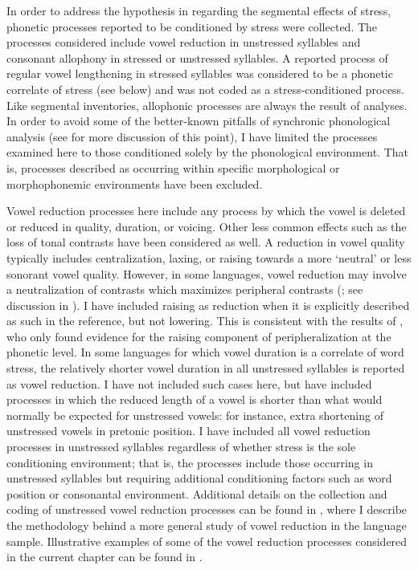   In order to address the hypothesis in  regarding the segmental effects of stress, phonetic processes reported to be conditioned by stress were collected. The processes considered include vowel reduction in unstressed syllables and consonant allophony in stressed or unstressed syllables. A reported process of regular vowel lengthening in stressed syllables was considered to be a phonetic correlate of stress (see below) and was not coded as a stress-conditioned process. Like segmental inventories, allophonic processes are always the result of analyses. In order to avoid some of the better-known pitfalls of synchronic phonological analysis (see  for more discussion of this point), I have limited the processes examined here to those conditioned solely by the phonological environment. That is, processes described as occurring within specific morphological or morphophonemic environments have been excluded.

  Vowel reduction processes here include any process by which the vowel is deleted or reduced in quality, duration, or voicing. Other less common effects such as the loss of tonal contrasts have been considered as well. A reduction in vowel quality typically includes centralization, laxing, or raising towards a more ‘neutral’ or less sonorant vowel quality. However, in some languages, vowel reduction may involve a neutralization of contrasts which maximizes peripheral contrasts (\citealt{Crosswhite2001}; see discussion in ). I have included raising as reduction when it is explicitly described as such in the reference, but not lowering. This is consistent with the results of \citet{KapatsinskiEtAl2019}, who only found evidence for the raising component of peripheralization at the phonetic level. In some languages for which vowel duration is a correlate of word stress, the relatively shorter vowel duration in all unstressed syllables is reported as vowel reduction. I have not included such cases here, but have included processes in which the reduced length of a vowel is shorter than what would normally be expected for unstressed vowels: for instance, extra shortening of unstressed vowels in pretonic position. I have included all vowel reduction processes in unstressed syllables regardless of whether stress is the sole conditioning environment; that is, the processes include those occurring in unstressed syllables but requiring additional conditioning factors such as word position or consonantal environment. Additional details on the collection and coding of unstressed vowel reduction processes can be found in , where I describe the methodology behind a more general study of vowel reduction in the language sample. Illustrative examples of some of the vowel reduction processes considered in the current chapter can be found in .

